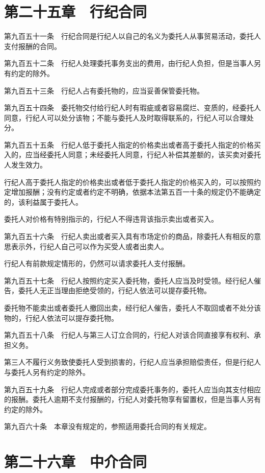\documentclass[UTF8,12pt,a4paper]{ctexbook}
\begin{document}
\section*{第二十五章　行纪合同}

第九百五十一条　行纪合同是行纪人以自己的名义为委托人从事贸易活动，委托人支付报酬的合同。

第九百五十二条　行纪人处理委托事务支出的费用，由行纪人负担，但是当事人另有约定的除外。

第九百五十三条　行纪人占有委托物的，应当妥善保管委托物。

第九百五十四条　委托物交付给行纪人时有瑕疵或者容易腐烂、变质的，经委托人同意，行纪人可以处分该物；不能与委托人及时取得联系的，行纪人可以合理处分。

第九百五十五条　行纪人低于委托人指定的价格卖出或者高于委托人指定的价格买入的，应当经委托人同意；未经委托人同意，行纪人补偿其差额的，该买卖对委托人发生效力。

行纪人高于委托人指定的价格卖出或者低于委托人指定的价格买入的，可以按照约定增加报酬；没有约定或者约定不明确，依据本法第五百一十条的规定仍不能确定的，该利益属于委托人。

委托人对价格有特别指示的，行纪人不得违背该指示卖出或者买入。

第九百五十六条　行纪人卖出或者买入具有市场定价的商品，除委托人有相反的意思表示外，行纪人自己可以作为买受人或者出卖人。

行纪人有前款规定情形的，仍然可以请求委托人支付报酬。

第九百五十七条　行纪人按照约定买入委托物，委托人应当及时受领。经行纪人催告，委托人无正当理由拒绝受领的，行纪人依法可以提存委托物。

委托物不能卖出或者委托人撤回出卖，经行纪人催告，委托人不取回或者不处分该物的，行纪人依法可以提存委托物。

第九百五十八条　行纪人与第三人订立合同的，行纪人对该合同直接享有权利、承担义务。

第三人不履行义务致使委托人受到损害的，行纪人应当承担赔偿责任，但是行纪人与委托人另有约定的除外。

第九百五十九条　行纪人完成或者部分完成委托事务的，委托人应当向其支付相应的报酬。委托人逾期不支付报酬的，行纪人对委托物享有留置权，但是当事人另有约定的除外。

第九百六十条　本章没有规定的，参照适用委托合同的有关规定。

\section*{第二十六章　中介合同}
\end{document}
